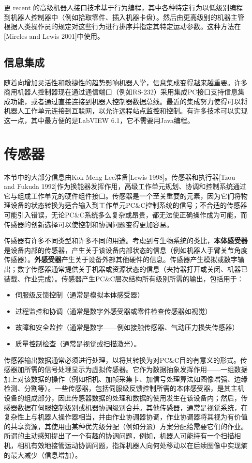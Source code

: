 \documentclass[UTF8,a4paper]{ctexart}
\begin{document}
更 recent 的高级机器人接口技术基于行为编程，其中各种特定行为以低级别编程到机器人控制器中（例如拾取零件、插入机器卡盘）。然后由更高级别的机器主管根据人类操作员的规定对这些行为进行排序并指定其特定运动参数。这种方法在[Mireles and Lewis 2001]中使用。

\subsection{信息集成}

随着向增加灵活性和敏捷性的趋势影响机器人学，信息集成变得越来越重要。许多商用机器人控制器现在通过通信端口（例如RS-232）采用集成PC接口支持信息集成功能，或者通过直接连接到机器人控制器数据总线。最近的集成努力使得可以将机器人工作单元连接到互联网，以允许远程站点监控和控制。有许多技术可以实现这一点，其中最方便的是LabVIEW 6.1，它不需要用Java编程。

\section{传感器}

本节中的大部分信息由Kok-Meng Lee准备[Lewis 1998]。传感器和执行器[Tzou and Fukuda 1992]作为换能器发挥作用，高级工作单元规划、协调和控制系统通过它与组成工作单元的硬件组件接口。传感器是一个至关重要的元素，因为它们将物理设备的状态转换为适合输入到工作单元PC\&C控制系统的信号；不合适的传感器可能引入错误，无论PC\&C系统多么复杂或昂贵，都无法使正确操作成为可能，而传感器的创新选择可以使控制和协调问题变得更加容易。

传感器有许多不同类型和许多不同的用途。考虑到与生物系统的类比，\textbf{本体感受器}是设备内部的传感器，产生关于该设备内部状态的信息（例如机器人手臂关节角度传感器）。\textbf{外感受器}产生关于设备外部其他硬件的信息。传感器产生模拟或数字输出；数字传感器通常提供关于机器或资源状态的信息（夹持器打开或关闭、机器已装载、作业完成）。传感器产生PC\&C层次结构所有级别所需的输出，包括用于：
\begin{itemize}
    \item 伺服级反馈控制（通常是模拟本体感受器）
    \item 过程监控和协调（通常是数字外感受器或零件检查传感器如视觉）
    \item 故障和安全监控（通常是数字——例如接触传感器、气动压力损失传感器）
    \item 质量控制检查（通常是视觉或扫描激光）。
\end{itemize}

传感器输出数据通常必须进行处理，以将其转换为对PC\&C目的有意义的形式。传感器加所需的信号处理显示为虚拟传感器。它作为数据抽象发挥作用——一组数据加上对该数据的操作（例如相机、加帧采集卡、加信号处理算法如图像增强、边缘检测、分割等）。一些传感器，包括伺服级反馈控制所需的本体感受器，是其主机设备的组成部分，因此传感器数据的处理和数据的使用发生在该设备内；然后，传感器数据在伺服控制级别或机器协调级别合并。其他传感器，通常是视觉系统，在复杂性上与机器人操作器相当，并由作业协调器协调，作业协调器将其视为有价值的共享资源，其使用由某种优先级分配（例如分派）方案分配给需要它们的作业。所谓的主动感知提出了一个有趣的协调问题，例如，机器人可能持有一个扫描相机，相机有效地接管运动协调问题，指挥机器人向何处移动以在后续图像中实现熵的最大减少（信息增加）。
\end{document}
